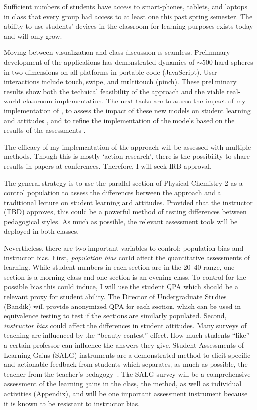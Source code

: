 \documentclass[10pt,letterpaper]{article}
\begin{document}
{Sufficient numbers of students have access to smart-phones, tablets, and laptops in class that every \pogil group had access to at least one this past spring semester. The ability to use students' devices in the classroom for learning purposes exists today and will only grow. 

Moving between visualization and class discussion is seamless. Preliminary development of the applications has demonstrated dynamics of $\sim500$ hard spheres in two-dimensions on all platforms in portable code (JavaScript). User interactions include touch, swipe, and multitouch (pinch). These preliminary results show both the technical feasibility of the approach and the viable real-world classroom implementation. The next  tasks are to assess the impact of my implementation of \pogil {}, to assess the impact of these new models on student learning and attitudes , and to refine the implementation of the models based on the results of the assessments .


The efficacy of my implementation of the  \pogil approach will be assessed with multiple methods. Though this is mostly `action research', there is the possibility to share results in papers at \pogil conferences. Therefore,  I will seek IRB approval. 

The general strategy is to use the parallel section of Physical Chemistry 2 as a control population to assess the differences between the \pogil approach and a traditional lecture on student learning and attitudes. Provided that the instructor (TBD) approves, this could be a powerful method of testing differences between pedagogical styles. As much as possible, the relevant assessment tools will be deployed in both classes. 

Nevertheless, there are two important variables to control: population bias and instructor bias. First, \textit{population bias} could affect the quantitative assessments of learning. While student numbers in each section are in the 20--40 range, one section is a morning class and one section is an evening class. To control for the possible bias this could induce, I will use the student QPA which should be a relevant proxy for student ability. The Director of Undergraduate Studies (Bandik) will provide anonymized QPA for each section, which can be used in equivalence testing to test if the sections are similarly populated. Second, \textit{instructor bias} could affect the differences in student attitudes. Many surveys of teaching are influenced by the ``beauty contest'' effect. How much students ``like'' a certain professor can influence the answers they give. Student Assessments of Learning Gains (SALG) instruments are a demonstrated method to elicit specific and actionable feedback from students which separates, as much as possible, the teacher from the teacher's pedagogy~\cite{Seymour2000}. The SALG survey will be a comprehensive assessment of the learning gains in the class, the \pogil method, as well as individual activities (Appendix), and will be one important assessment instrument because it is known to be resistant to instructor bias.
}%
\end{document}

